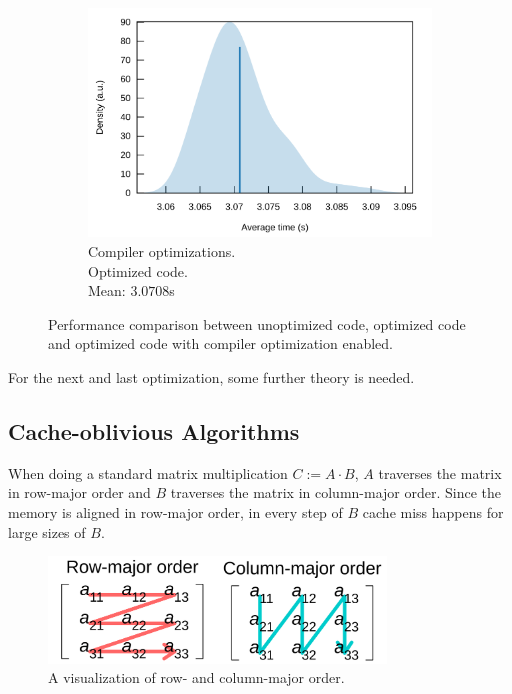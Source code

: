 \begin{figure}[H]
\begin{subfigure}{.33\textwidth}
\end{subfigure}%
\begin{subfigure}{.33\textwidth}
  \centering
  \includegraphics[width=\linewidth]{./assets/compiler_optimized.png}
  \caption{Compiler optimizations.\\\hspace*{0.6cm}Optimized code.\\\hspace*{0.6cm}Mean: $3.0708$s}
\end{subfigure}%
  \caption{Performance comparison between unoptimized code, optimized code and optimized code with compiler optimization enabled.}
\end{figure}

For the next and last optimization, some further theory is needed.
\subsection{Cache-oblivious Algorithms}

When doing a standard matrix multiplication $C:=A \cdot B$, $A$ traverses the matrix in row-major order and $B$ traverses the matrix in column-major order. Since the memory is aligned in row-major order, in every step of $B$ cache miss happens for large sizes of $B$.

\begin{figure}[H]
  \centering
  \includegraphics[width=0.8\textwidth]{./assets/rowcol}
  \caption{A visualization of row- and column-major order.}
\end{figure}

